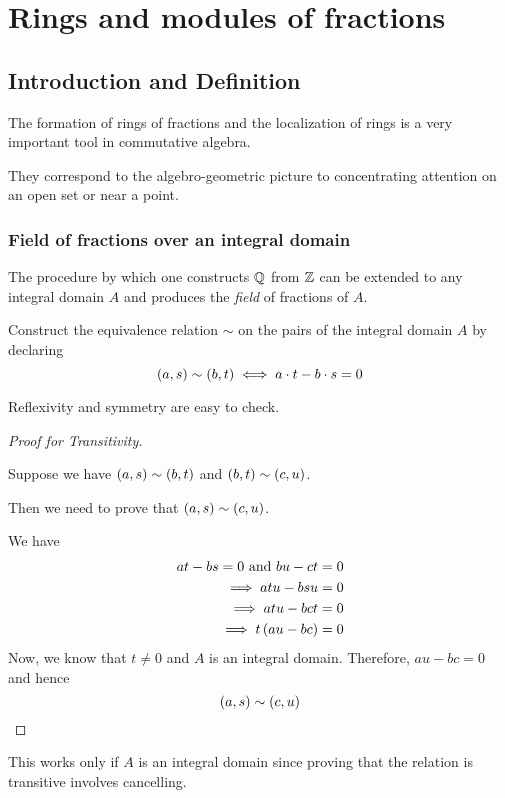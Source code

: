 \chapter{Rings and modules of fractions}
\label{ch:book_03_rings_and_modules_of_fractions}


\section{Introduction and Definition}
The formation of rings of fractions and the localization of rings
is a very important tool in commutative algebra.

They correspond to the algebro-geometric picture to concentrating attention
on an open set or near a point.

\subsection{Field of fractions over an integral domain}

The procedure by which one constructs \(\QQ\) from \(\ZZ\) can
be extended to any integral domain \(A\) and
produces the \emph{field} of fractions of \(A\).

Construct the equivalence relation \(\sim\) on the pairs of the
integral domain \(A\) by declaring
\[
	\left( a, s \right) \sim \left( b, t \right) \iff a \cdot t - b \cdot s = 0
\]

Reflexivity and symmetry are easy to check.

\begin{proof}[Proof for Transitivity] \

	Suppose we have \(\left( a, s \right) \sim \left( b, t \right)\) and
	\(\left( b, t \right) \sim \left( c, u \right)\).

	Then we need to prove that \(\left( a, s \right) \sim \left( c, u \right)\).

	We have
	\begin{align*}
		at - bs = 0 \text{ and } bu - ct = 0 \\
		\implies atu - bsu = 0 \\
		\implies atu - bct = 0 \\
		\implies t \left( au - bc \right) = 0
	\end{align*}
	Now, we know that \(t \neq 0\) and \(A\) is an integral domain.
	Therefore, \(au - bc = 0\) and hence
	\[
		\left( a, s \right) \sim \left( c, u \right)
	\]
\end{proof}

This works only if \(A\) is an integral domain since proving
that the relation is transitive involves cancelling.

